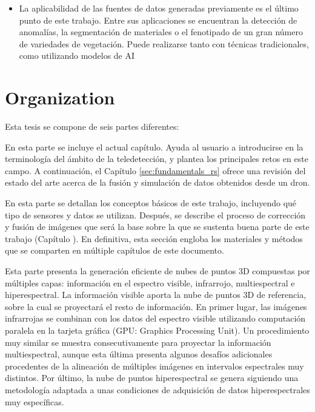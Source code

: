 \begin{itemize}
    \item La aplicabilidad de las fuentes de datos generadas previamente es el último punto de este trabajo. Entre sus aplicaciones se encuentran la detección de anomalías, la segmentación de materiales o el fenotipado de un gran número de variedades de vegetación. Puede realizarse tanto con técnicas tradicionales, como utilizando modelos de AI
\end{itemize}

\section{Organization}

Esta tesis se compone de seis partes diferentes:

\small {} \normalsize\hspace{3mm} En esta parte se incluye el actual capítulo. Ayuda al usuario a introducirse en la terminología del ámbito de la teledetección, y plantea los principales retos en este campo. A continuación, el Capítulo \ref{sec:fundamentals_rs} ofrece una revisión del estado del arte acerca de la fusión y simulación de datos obtenidos desde un dron.

\small {} \normalsize\hspace{3mm} En esta parte se detallan los conceptos básicos de este trabajo, incluyendo qué tipo de sensores y datos se utilizan. Después, se describe el proceso de corrección y fusión de imágenes que será la base sobre la que se sustenta buena parte de este trabajo (Capítulo ). En definitiva, esta sección engloba los materiales y métodos que se comparten en múltiple capítulos de este documento.

\small {} \normalsize\hspace{3mm} Esta parte presenta la generación eficiente de nubes de puntos 3D compuestas por múltiples capas: información en el espectro visible, infrarrojo, multiespectral e hiperespectral. La información visible aporta la nube de puntos 3D de referencia, sobre la cual se proyectará el resto de información. En primer lugar, las imágenes infrarrojas se combinan con los datos del espectro visible utilizando computación paralela en la tarjeta gráfica (GPU: Graphics Processing Unit). Un procedimiento muy similar se muestra consecutivamente para proyectar la información multiespectral, aunque esta última presenta algunos desafíos adicionales procedentes de la alineación de múltiples imágenes en intervalos espectrales muy distintos. Por último, la nube de puntos hiperespectral se genera siguiendo una metodología adaptada a unas condiciones de adquisición de datos hiperespectrales muy específicas.

